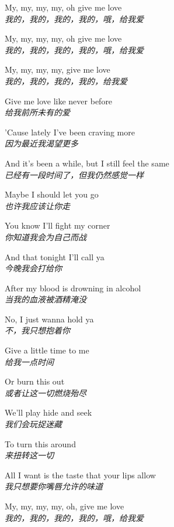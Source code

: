 \begin{spacing}{1.5}
\begin{flushleft}
My, my, my, my, oh give me love\\
\textit{我的，我的，我的，我的，哦，给我爱}\lyricspace

My, my, my, my, oh give me love\\
\textit{我的，我的，我的，我的，哦，给我爱}\lyricspace

My, my, my, my, give me love\\
\textit{我的，我的，我的，我的，给我爱}\lyricspace

Give me love like never before\\
\textit{给我前所未有的爱}\lyricspace

'Cause lately I've been craving more\\
\textit{因为最近我渴望更多}\lyricspace

And it's been a while, but I still feel the same\\
\textit{已经有一段时间了，但我仍然感觉一样}\lyricspace

Maybe I should let you go\\
\textit{也许我应该让你走}\lyricspace

You know I'll fight my corner\\
\textit{你知道我会为自己而战}\lyricspace

And that tonight I'll call ya\\
\textit{今晚我会打给你}\lyricspace

After my blood is drowning in alcohol\\
\textit{当我的血液被酒精淹没}\lyricspace

No, I just wanna hold ya\\
\textit{不，我只想抱着你}\lyricspace

Give a little time to me\\
\textit{给我一点时间}\lyricspace

Or burn this out\\
\textit{或者让这一切燃烧殆尽}\lyricspace

We'll play hide and seek\\
\textit{我们会玩捉迷藏}\lyricspace

To turn this around\\
\textit{来扭转这一切}\lyricspace

All I want is the taste that your lips allow\\
\textit{我只想要你嘴唇允许的味道}\lyricspace

My, my, my, my, oh, give me love\\
\textit{我的，我的，我的，我的，哦，给我爱}\lyricspace


\end{flushleft}
\end{spacing}
